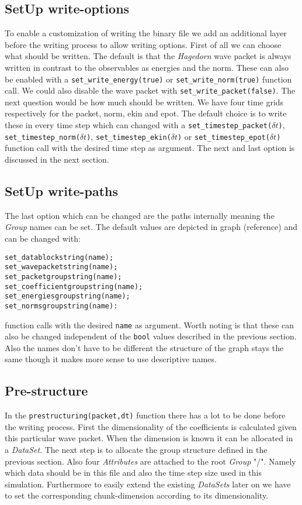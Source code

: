 \documentclass{article}
\begin{document}
\subsection{SetUp write-options}
To enable a customization of writing the binary file we add an additional layer before the writing process to allow writing options. First of all we can choose what should be written. The default is that the \textit{Hagedorn} wave packet is always written in contrast to the observables as energies and the norm. These can also be enabled with a \texttt{set\_write\_energy(true)} or \texttt{set\_write\_norm(true)} function call. We could also disable the wave packet with \texttt{set\_write\_packet(false)}. The next question would be how much should be written. We have four time grids respectively for the packet, norm, ekin and epot. The default choice is to write these in every time step which can changed with a \texttt{set\_timestep\_packet($\delta t$)}, \texttt{set\_timestep\_norm($\delta t$)}, \texttt{set\_timestep\_ekin($\delta t$)} or \texttt{set\_timestep\_epot($\delta t$)} function call with the desired time step as argument. The next and last option is discussed in the next section. 


\subsection{SetUp write-paths}
The last option which can be changed are the paths internally meaning the \textit{Group} names can be set. The default values are depicted in graph (reference) and can be changed with:
\begin{lstlisting}
set_datablockstring(name);
set_wavepacketstring(name);
set_packetgroupstring(name);
set_coefficientgroupstring(name);
set_energiesgroupstring(name);
set_normsgroupstring(name):
\end{lstlisting}
function calls with the desired \texttt{name} as argument. Worth noting is that these can also be changed independent of the \texttt{bool} values described in the previous section. Also the names don't have to be different the structure of the graph stays the same though it makes more sense to use descriptive names.

\subsection{Pre-structure}
In the \texttt{prestructuring(packet,dt)} function there has a lot to be done before the writing process. First the dimensionality of the coefficients is calculated given this particular wave packet. When the dimension is known it can be allocated in a \textit{DataSet}. The next step is to allocate the group structure defined in the previous section. Also four \textit{Attributes} are attached to the root \textit{Group} "/". Namely which data should be in this file and also the time step size used in this simulation. Furthermore to easily extend the existing \textit{DataSets} later on we have to set the corresponding chunk-dimension according to its dimensionality. 
\end{document}
